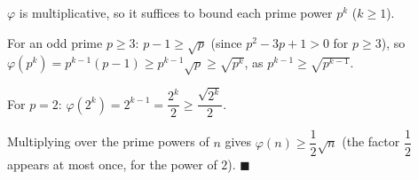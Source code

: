 $\varphi$ is multiplicative, so it suffices to bound each prime power $p^k$ ($k\ge1$).

For an odd prime $p\ge3$: $p-1\ge\sqrt p$ (since $p^2-3p+1>0$ for $p\ge3$), so $\varphi(p^k)=p^{k-1}(p-1)\ge p^{k-1}\sqrt p\ge\sqrt{p^k}$, as $p^{k-1}\ge\sqrt{p^{k-1}}$.

For $p=2$: $\varphi(2^k)=2^{k-1}=\dfrac{2^k}2\ge\dfrac{\sqrt{2^k}}2$.

Multiplying over the prime powers of $n$ gives $\varphi(n)\ge\dfrac12\sqrt n$ (the factor $\dfrac12$ appears at most once, for the power of $2$). $\blacksquare$
